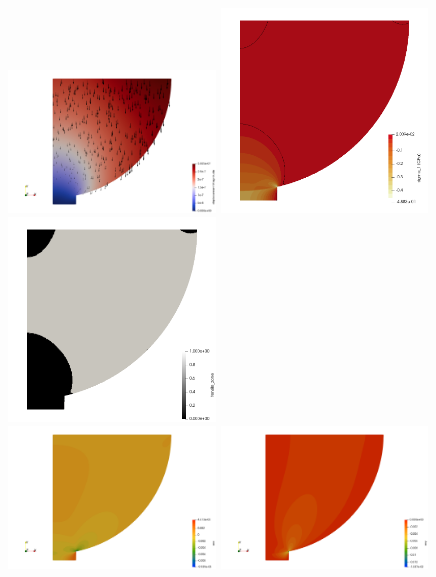 \begin{center}
\includegraphics[width=5.5cm]{python_codes/fieldstone_63/results/disp}
\includegraphics[width=5.5cm]{python_codes/fieldstone_63/results/sigma_1}
\includegraphics[width=5.5cm]{python_codes/fieldstone_63/results/tensile_zone}\\
\includegraphics[width=5.5cm]{python_codes/fieldstone_63/results/exx}
\includegraphics[width=5.5cm]{python_codes/fieldstone_63/results/exy}

\end{center}
